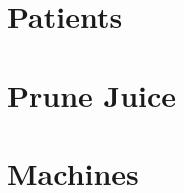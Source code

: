 \documentclass{article}[12pt]
\newcommand{\shrink}[2]{\scalebox{#2}{\parbox{\textwidth}{}}}
\begin{document}
\section{Patients}
\shrink{results/doctor.txt}{.75}  \newpage

\section{Prune Juice}
\shrink{results/prunejuice.txt}{.8} \newpage

\section{Machines}
\shrink{results/machine.txt}{.6} \newpage
\end{document}
